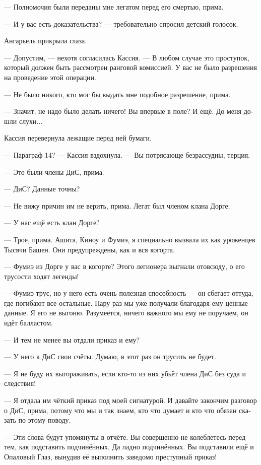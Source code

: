 \documentclass[a4paper,12pt,fleqn]{book}\usepackage{polyglossia}\setdefaultlanguage[babelshorthands=true]{russian}\setotherlanguage{english}\defaultfontfeatures{Ligatures=TeX,Mapping=tex-text}\usepackage{xcolor}\newcommand{\ml}[3]{#2}
\begin{document}
--- Полномочия были переданы мне легатом перед его смертью, прима.

--- И у вас есть доказательства? --- требовательно спросил детский голосок.

Ангарьель прикрыла глаза.

--- Допустим, --- нехотя согласилась Кассия.
--- В любом случае это проступок, который должен быть рассмотрен ранговой комиссией.
У вас не было разрешения на проведение этой операции.

--- Не было никого, кто мог бы выдать мне подобное разрешение, прима.

--- Значит, не надо было делать ничего!
Вы впервые в поле?
И ещё.
До меня дошли слухи...

Кассия перевернула лежащие перед ней бумаги.

--- Параграф 14? --- Кассия вздохнула.
--- Вы потрясающе безрассудны, терция.

--- Это были члены ДиС, прима.

--- ДиС?
Данные точны?

--- Не вижу причин им не верить, прима.
Легат был членом клана Дорге.

--- У нас ещё есть клан Дорге?

--- Трое, прима.
Ашита, Киноу и Фумиэ, я специально вызвала их как уроженцев Тысячи Башен.
Они предупреждены, как и вся когорта.

--- Фумиэ из Дорге у вас в когорте?
Этого легионера выгнали отовсюду, о его трусости ходят легенды!

--- Фумиэ трус, но у него есть очень полезная способность --- он сбегает оттуда, где погибают все остальные.
Пару раз мы уже получали благодаря ему ценные данные.
Я его не выгоню.
Разумеется, ничего важного мы ему не поручаем, он идёт балластом.

--- И тем не менее вы отдали приказ и ему?

--- У него к ДиС свои счёты.
Думаю, в этот раз он трусить не будет.

--- Я не буду их выгораживать, если кто-то из них убьёт члена ДиС без суда и следствия!

--- Я отдала им чёткий приказ под моей сигнатурой.
И давайте закончим разговор о ДиС, прима, потому что мы и так знаем, кто что думает и кто что обязан сказать по этому поводу.

--- Эти слова будут упомянуты в отчёте.
Вы совершенно не колеблетесь перед тем, как подставить подчинённых.
Да ладно подчинённых.
Вы подставили ещё и Опаловый Глаз, вынудив её выполнить заведомо преступный приказ!
\end{document}
